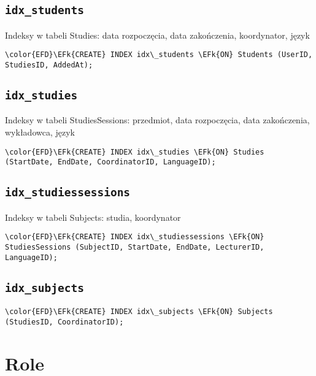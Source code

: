 \documentclass[11pt]{article}
\newcommand{\EFk}[1]{\textcolor{EFk}{\textbf{#1}}} %
\begin{document}
\subsection{\texttt{idx\_students}}
\label{sec:org335d00d}
Indeksy w tabeli Studies: data rozpoczęcia, data zakończenia, koordynator, język
\begin{Code}
\begin{Verbatim}
\color{EFD}\EFk{CREATE} INDEX idx\_students \EFk{ON} Students (UserID, StudiesID, AddedAt);
\end{Verbatim}
\end{Code}
\subsection{\texttt{idx\_studies}}
\label{sec:org25d3292}
Indeksy w tabeli StudiesSessions: przedmiot, data rozpoczęcia, data zakończenia, wykładowca, język
\begin{Code}
\begin{Verbatim}
\color{EFD}\EFk{CREATE} INDEX idx\_studies \EFk{ON} Studies (StartDate, EndDate, CoordinatorID, LanguageID);
\end{Verbatim}
\end{Code}
\subsection{\texttt{idx\_studiessessions}}
\label{sec:org5e7953f}
Indeksy w tabeli Subjects: studia, koordynator
\begin{Code}
\begin{Verbatim}
\color{EFD}\EFk{CREATE} INDEX idx\_studiessessions \EFk{ON} StudiesSessions (SubjectID, StartDate, EndDate, LecturerID, LanguageID);
\end{Verbatim}
\end{Code}
\subsection{\texttt{idx\_subjects}}
\label{sec:org6da4363}

\begin{Code}
\begin{Verbatim}
\color{EFD}\EFk{CREATE} INDEX idx\_subjects \EFk{ON} Subjects (StudiesID, CoordinatorID);
\end{Verbatim}
\end{Code}
\section{Role}
\label{sec:org320dcd1}
\end{document}

